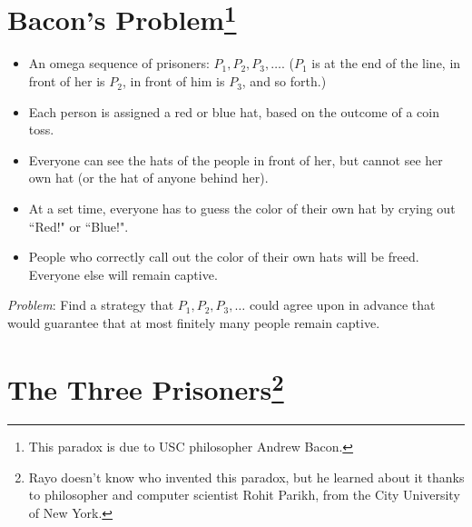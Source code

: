 \documentclass[12pt]{extarticle}
\begin{document}
\section{Bacon's Problem\footnote{This paradox is due to USC philosopher Andrew Bacon. 
} {\normalsize {}}}


\begin{itemize}

\item An omega sequence of prisoners: \(P_1,P_2,P_3,\dots\). (\(P_1\) is at the end of the line, in front of her is \(P_2\), in front of him is \(P_3\), and so forth.) 

\item Each person is assigned a red or blue hat, based on the outcome of a coin toss. 

\item Everyone can see the hats of the people in front of her, but cannot see her own hat (or the hat of anyone behind her). 

\item At a set time, everyone has to guess the color of their own hat by crying out ``Red!" or ``Blue!".

\item  People who correctly call out the color of their own hats will be freed. Everyone else will remain captive. %

\end{itemize}

\noindent
\emph{Problem}: Find a strategy that \(P_1, P_2, P_3, \ldots\) could agree upon in advance that would guarantee that at most finitely many people remain captive. %



\section{The Three Prisoners\footnote{Rayo doesn't know who invented this paradox, but he learned about it thanks to philosopher and computer scientist Rohit Parikh, from the City University of New York. } {\normalsize {}}}
\end{document}

